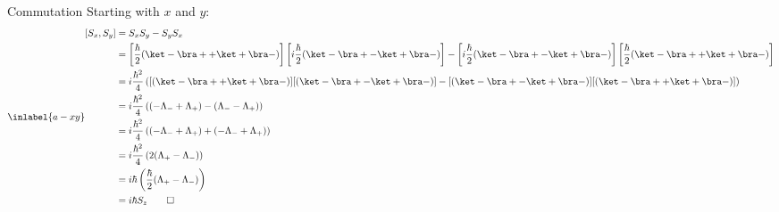 \begin{answer}
\begin{answerpart}{Commutation}
    Starting with $x$ and $y$:
    \begin{equation}
      \inlabel{a-xy}
      \begin{split}
        [S_x, S_y]
        &= S_xS_y - S_yS_x \\
        &=
        \left[\frac \hbar 2 (\ket - \bra + + \ket + \bra -)\right]
        \left[i \frac \hbar 2 (\ket - \bra + - \ket + \bra -)\right]
        -
        \left[i \frac \hbar 2 (\ket - \bra + - \ket + \bra -)\right]
        \left[\frac \hbar 2 (\ket - \bra + + \ket + \bra -)\right]
        \\
        &=
        i \frac{\hbar^2}{4}
        \left(
        [(\ket - \bra + + \ket + \bra -)]
        [(\ket - \bra + - \ket + \bra -)]
        -
        [(\ket - \bra + - \ket + \bra -)]
        [(\ket - \bra + + \ket + \bra -)]
        \right)
        \\
        &=
        i \frac{\hbar^2}{4}
        \left( (-\Lambda_- + \Lambda_+) - (\Lambda_- - \Lambda_+) \right)
        \\
        &= i \frac{\hbar^2}{4}
        \left( (-\Lambda_- + \Lambda_+) + (-\Lambda_- + \Lambda_+) \right) \\
        &= i \frac{\hbar^2}{4} \left( 2 (\Lambda_+ - \Lambda_-) \right) \\
        &= i \hbar \left( \frac{\hbar}{2} (\Lambda_+ - \Lambda_-) \right) \\
        &= i \hbar S_z \qed{}\\
      \end{split}
    \end{equation}


\end{answerpart}
\end{answer}
